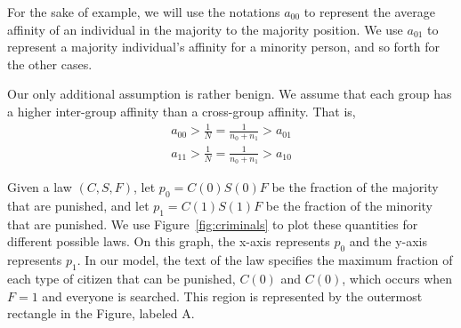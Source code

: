 
For the sake of example, we will use the notations $a_{00}$ to represent the average affinity of an individual in the majority to the majority position.  We use $a_{01}$ to represent a majority individual's affinity for a minority person, and so forth for the other cases.  

Our only additional assumption is rather benign.  We assume that each group has a higher inter-group affinity than a cross-group affinity.  That is, 
\begin{align}
a_{00} > \frac{1}{N}=\frac{1}{n_0+n_1} > a_{01} \\
a_{11} > \frac{1}{N}=\frac{1}{n_0+n_1}>  a_{10}
\end{align}

Given a law $(C, S, F)$, let $p_0 = C(0)S(0)F$ be the fraction of the majority that are punished, and let $p_1 = C(1)S(1)F$ be the fraction of the minority that are punished.  We use Figure~\ref{fig:criminals} to plot these quantities for different possible laws.  On this graph, the x-axis represents $p_0$ and the y-axis represents $p_1$.  In our model, the text of the law specifies the maximum fraction of each type of citizen that can be punished, $C(0)$ and $C(0)$, which occurs when $F=1$ and everyone is searched.  This region is represented by the outermost rectangle in the Figure, labeled A.



